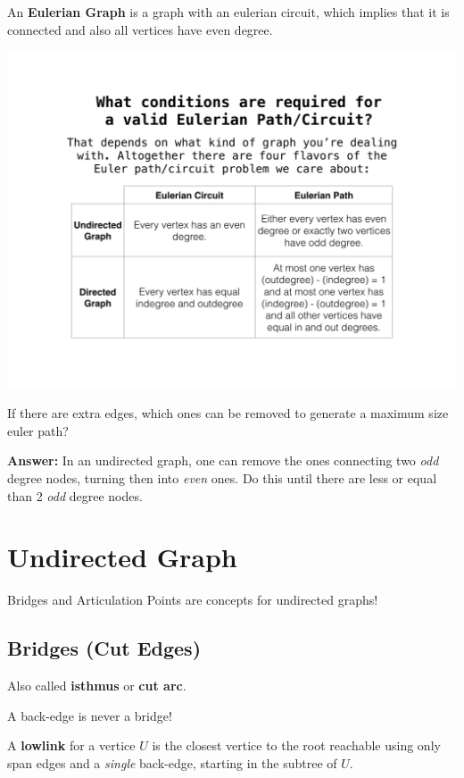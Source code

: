 	An \textbf{Eulerian Graph} is a graph with an eulerian circuit, which implies that it is connected and 
	also all vertices have even degree.

	\begin{center}
	\includegraphics[scale=.1, keepaspectratio]{content/graph/Eulerian-Path-Existence.png}
	\end{center}

	If there are extra edges, which ones can be removed to generate a maximum size euler path?

	\textbf{Answer:} In an undirected graph, one can remove the ones connecting two \textit{odd} degree 
	nodes, turning then into \textit{even} ones. Do this until there are less or equal than 2 \textit{odd} degree nodes. 


\section{Undirected Graph}

	Bridges and Articulation Points are concepts for undirected graphs!
	
	\subsection{Bridges (Cut Edges)}

		Also called \textbf{isthmus} or \textbf{cut arc}.
		
		A back-edge is never a bridge!
		
		A \textbf{lowlink} for a vertice $U$ is the closest vertice to the root reachable using only span edges and a \textit{single} back-edge, starting in the subtree of $U$.
		
